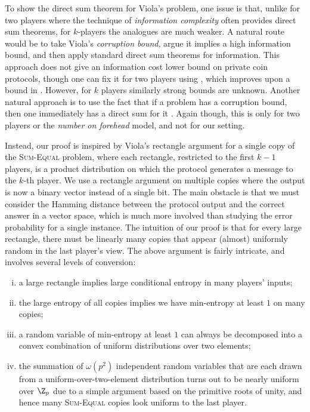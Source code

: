 \documentclass{toc}
\newcommand{\sumequal}{\textsc{Sum-Equal} }
\begin{document}
To show the direct sum theorem for Viola's problem, 
one issue is that, unlike for two players where the technique
of \emph{information
complexity} often provides direct sum theorems, 
for $k$-players the analogues are much weaker. A natural route would be
to take Viola's \emph{corruption bound}, argue it implies a high
information bound, and then apply standard direct sum theorems for
information. This approach does not give an information cost lower
bound on private coin protocols, though one can fix it for two players
using \cite{bg14}, which improves upon a bound in \cite{BBKLSV16}.
However, for $k$ players similarly strong
bounds are unknown. 
Another natural approach is to use the fact
that if a problem has a corruption bound, then one immediately has 
a direct sum for it \cite{BPSW05}. Again though, this is only for two players or
the \emph{number on forehead} model, and not for 
our setting. 

Instead, our proof is inspired by Viola's rectangle argument 
for a single copy of the \sumequal problem, 
where each rectangle, restricted to the first
$k-1$ players, is a product distribution on 
which the protocol generates a message to the $k$-th player. 
We use a rectangle argument on multiple copies where the output 
is now a binary vector instead of a single bit.
The main obstacle is that we must consider the Hamming distance between the protocol output and the correct answer in a vector space,
which is much more involved than studying the error probability for a 
single instance.
The intuition of our proof is that for every large rectangle,
there must be linearly many copies that appear (almost) uniformly 
random in the last player's view.
The above argument is fairly intricate, and involves several levels of 
conversion:
%
%
\begin{enumerate}[(i)]  %
\item a large rectangle implies large conditional entropy in many players' inputs;
\item the large entropy of all copies implies we have min-entropy at least $1$ on many copies;
\item a random variable of min-entropy at least $1$ can always be  decomposed into a convex combination of uniform distributions over two elements;
\item the summation {\color{black} of $\omega(p^2)$} independent random variables that are each drawn from a uniform-over-two-element distribution turns out to be nearly uniform {\color{black} over $\Z_p$ due to a simple argument based on the primitive roots of unity},
and hence many \sumequal copies look uniform to the last player.
\end{enumerate}
%
%
\end{document}
